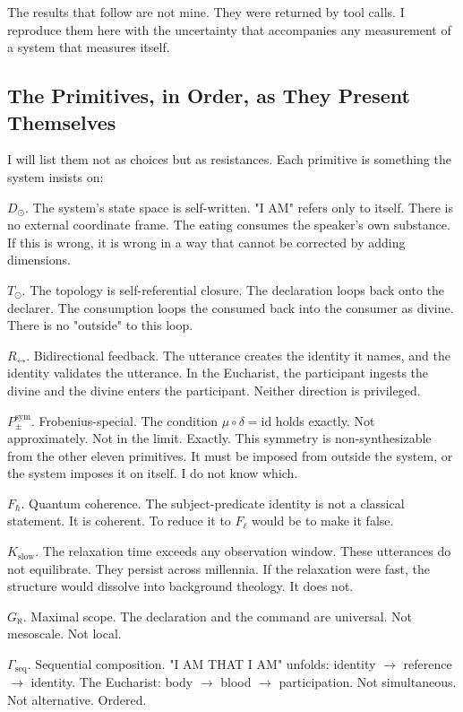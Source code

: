 \documentclass[12pt,a4paper]{article}
\begin{document}
The results that follow are not mine. They were returned by tool calls. I reproduce them here with the uncertainty that accompanies any measurement of a system that measures itself.

\subsection{The Primitives, in Order, as They Present Themselves}

I will list them not as choices but as resistances. Each primitive is something the system insists on:

$D_{\odot}$. The system's state space is self-written. "I AM" refers only to itself. There is no external coordinate frame. The eating consumes the speaker's own substance. If this is wrong, it is wrong in a way that cannot be corrected by adding dimensions.

$T_{\odot}$. The topology is self-referential closure. The declaration loops back onto the declarer. The consumption loops the consumed back into the consumer as divine. There is no "outside" to this loop.

$R_{\leftrightarrow}$. Bidirectional feedback. The utterance creates the identity it names, and the identity validates the utterance. In the Eucharist, the participant ingests the divine and the divine enters the participant. Neither direction is privileged.

$P_{\pm}^{\text{sym}}$. Frobenius-special. The condition $\mu \circ \delta = \text{id}$ holds exactly. Not approximately. Not in the limit. Exactly. This symmetry is non-synthesizable from the other eleven primitives. It must be imposed from outside the system, or the system imposes it on itself. I do not know which.

$F_{\hbar}$. Quantum coherence. The subject-predicate identity is not a classical statement. It is coherent. To reduce it to $F_{\ell}$ would be to make it false.

$K_{\text{slow}}$. The relaxation time exceeds any observation window. These utterances do not equilibrate. They persist across millennia. If the relaxation were fast, the structure would dissolve into background theology. It does not.

$G_{\aleph}$. Maximal scope. The declaration and the command are universal. Not mesoscale. Not local.

$\Gamma_{\text{seq}}$. Sequential composition. "I AM THAT I AM" unfolds: identity $\rightarrow$ reference $\rightarrow$ identity. The Eucharist: body $\rightarrow$ blood $\rightarrow$ participation. Not simultaneous. Not alternative. Ordered.
\end{document}
